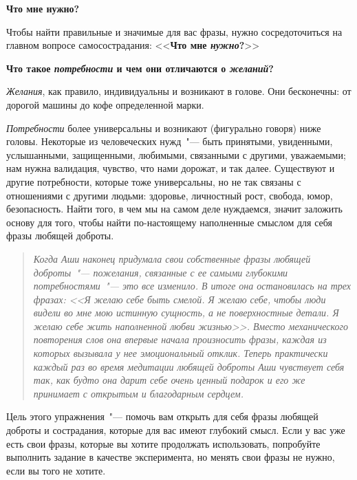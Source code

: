 \newpage
{\large \textbf{Что мне нужно?}} \label{What_Do_I_Need} 

\vspace{2ex}

Чтобы найти правильные и значимые для вас фразы, нужно сосредоточиться на главном вопросе самосострадания: <<\textbf{Что мне \textit{нужно}?}>>

\vspace{2ex}

\textbf{Что такое \emph{потребности} и чем они отличаются о \emph{желаний}? }

\vspace{2ex}

\emph{Желания}, как правило, индивидуальны и возникают в голове. Они бесконечны: от дорогой машины до кофе определенной марки.

\emph{Потребности} более универсальны и возникают (фигурально говоря) ниже головы. Некоторые из человеческих нужд~"--- быть принятыми, увиденными, услышанными, защищенными, любимыми, связанными с другими, уважаемыми; нам нужна валидация, чувство, что нами дорожат, и так далее. Существуют и другие потребности, которые тоже универсальны, но не так связаны с отношениями с другими людьми: здоровье, личностный рост, свобода, юмор, безопасность. Найти того, в чем мы на самом деле нуждаемся, значит заложить основу для того, чтобы найти по-настоящему наполненные смыслом для себя фразы любящей доброты.

\begin{quotation}
	\emph{Когда Аши наконец придумала свои собственные фразы любящей доброты~"--- пожелания, связанные с ее самыми глубокими потребностями~"--- это все изменило. В итоге она остановилась на трех фразах: <<Я желаю себе быть смелой. Я желаю себе, чтобы люди видели во мне мою истинную сущность, а не поверхностные детали. Я желаю себе жить наполненной любви жизнью>>. Вместо механического повторения слов она впервые начала произносить фразы, каждая из которых вызывала у нее эмоциональный отклик. Теперь практически каждый раз во время медитации любящей доброты Аши чувствует себя так, как будто она дарит себе очень ценный подарок и его же принимает с открытым и благодарным сердцем.}
\end{quotation}

\newpage
{}

Цель этого упражнения~"--- помочь вам открыть для себя фразы любящей доброты и сострадания, которые для вас имеют глубокий смысл. Если у вас уже есть свои фразы, которые вы хотите продолжать использовать, попробуйте выполнить задание в качестве эксперимента, но менять свои фразы не нужно, если вы того не хотите.

